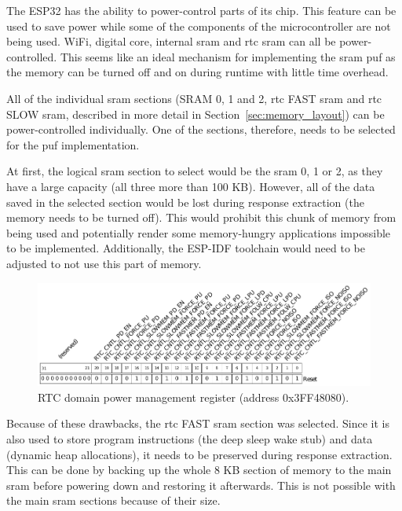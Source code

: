 The ESP32 has the ability to power-control parts of its chip. This feature can be used to save power while some of the components of the microcontroller are not being used. WiFi, digital core, internal \gls{sram} and \gls{rtc} \gls{sram} can all be power-controlled. This seems like an ideal mechanism for implementing the \gls{sram} \gls{puf} as the memory can be turned off and on during runtime with little time overhead.\cite{esp322021}

All of the individual \gls{sram} sections (SRAM 0, 1 and 2, \gls{rtc} FAST \gls{sram} and \gls{rtc} SLOW \gls{sram}, described in more detail in Section~\ref{sec:memory_layout}) can be power-controlled individually. One of the sections, therefore, needs to be selected for the \gls{puf} implementation.

At first, the logical \gls{sram} section to select would be the \gls{sram} 0, 1 or 2, as they have a large capacity (all three more than 100 KB). However, all of the data saved in the selected section would be lost during response extraction (the memory needs to be turned off). This would prohibit this chunk of memory from being used and potentially render some memory-hungry applications impossible to be implemented. Additionally, the ESP-IDF toolchain would need to be adjusted to not use this part of memory. 

\begin{figure}[ht!]
    \centering
    \captionsetup{justification=centering,margin=0.5cm}
    \includegraphics[width=\textwidth]{images/rtc_register.pdf}
    \caption[RTC domain power management register (address 0x3FF48080).]{RTC domain power management register (address 0x3FF48080).\cite{esp322021}}
    \label{fig:rtc_register}
\end{figure}

Because of these drawbacks, the \gls{rtc} FAST \gls{sram} section was selected. Since it is also used to store program instructions (the deep sleep wake stub) and data (dynamic heap allocations), it needs to be preserved during response extraction. This can be done by backing up the whole 8 KB section of memory to the main \gls{sram} before powering down and restoring it afterwards. This is not possible with the main \gls{sram} sections because of their size.

